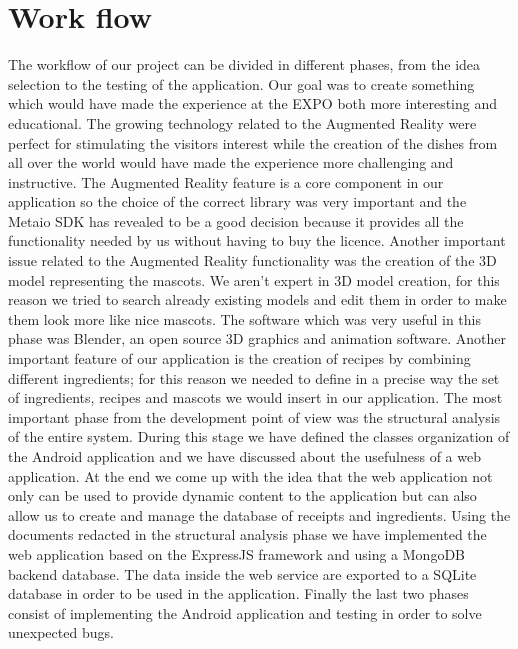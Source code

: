 
\section{Work flow}
The workflow of our project can be divided in different phases, from the idea selection to the testing of the application. Our goal was to create something which would have made the experience at the EXPO both more interesting and educational. The growing technology related to the Augmented Reality were perfect for stimulating the visitors interest while the creation of the dishes from all over the world would have made the experience more challenging and instructive. The Augmented Reality feature is a core component in our application so the choice of the correct library was very important and the Metaio SDK has revealed to be a good decision because it provides all the functionality needed by us without having to buy the licence. Another important issue related to the Augmented Reality functionality was the creation of the 3D model representing the mascots. We aren't expert in 3D model creation, for this reason we tried to search already existing models and edit them in order to make them look more like nice mascots. The software which was very useful in this phase was Blender, an open source 3D graphics and animation software. Another important feature of our application is the creation of recipes by combining different ingredients; for this reason we needed to define in a precise way the set of ingredients, recipes and mascots we would insert in our application.
The most important phase from the development point of view was the structural analysis of the entire system. During this stage we have defined the classes organization of the Android application and we have discussed about the usefulness of a web application. At the end we come up with the idea that the web application not only can be used to provide dynamic content to the application but can also allow us to create and manage the database of receipts and ingredients. Using the documents redacted in the structural analysis phase we have implemented the web application based on the ExpressJS framework and using a MongoDB backend database. The data inside the web service are exported to a SQLite database in order to be used in the application. Finally the last two phases consist of implementing the Android application and testing in order to solve unexpected bugs.